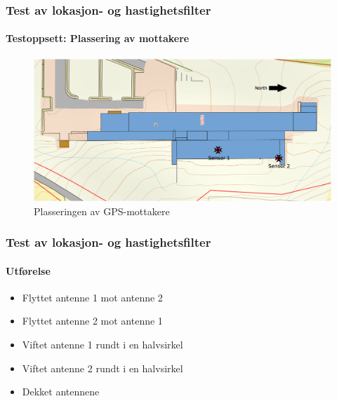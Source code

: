 \documentclass[xcolor=table]{beamer}
\begin{document}
\begin{frame}
\frametitle{Test av lokasjon- og hastighetsfilter}
\framesubtitle{Testoppsett: Plassering av mottakere}
      \begin{figure}
        \includegraphics[scale=0.18]{thesis/graphics/roof.eps}
        \caption{Plasseringen av GPS-mottakere}
      \end{figure}
\end{frame}

\begin{frame}
\frametitle{Test av lokasjon- og hastighetsfilter}
\framesubtitle{Utførelse}
      \begin{itemize}
        \setlength\itemsep{2em}
        \item Flyttet antenne 1 mot antenne 2
        \item Flyttet antenne 2 mot antenne 1
        \item Viftet antenne 1 rundt i en halvsirkel
        \item Viftet antenne 2 rundt i en halvsirkel
        \item Dekket antennene
      \end{itemize}
\end{frame}
\end{document}
